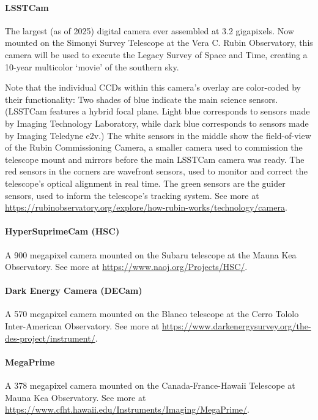 \paragraph{LSSTCam}

The largest (as of 2025) digital camera ever assembled at 3.2 gigapixels.
Now mounted on the Simonyi Survey Telescope at the Vera C. Rubin Observatory, this camera will be used to execute the Legacy Survey of Space and Time, creating a 10-year multicolor `movie' of the southern sky.

Note that the individual CCDs within this camera's overlay are color-coded by their functionality:
Two shades of blue indicate the main science sensors.
(LSSTCam features a hybrid focal plane.
Light blue corresponds to sensors made by Imaging Technology Laboratory, while dark blue corresponds to sensors made by Imaging Teledyne e2v.)
The white sensors in the middle show the field-of-view of the Rubin Commissioning Camera, a smaller camera used to commission the telescope mount and mirrors before the main LSSTCam camera was ready.
The red sensors in the corners are wavefront sensors, used to monitor and correct the telescope's optical alignment in real time.
The green sensors are the guider sensors, used to inform the telescope's tracking system.
See more at \url{https://rubinobservatory.org/explore/how-rubin-works/technology/camera}.

\paragraph{HyperSuprimeCam (HSC)}

A 900 megapixel camera mounted on the Subaru telescope at the Mauna Kea Observatory.
See more at \url{https://www.naoj.org/Projects/HSC/}.

\paragraph{Dark Energy Camera (DECam)}

A 570 megapixel camera mounted on the Blanco telescope at the Cerro Tololo Inter-American Observatory.
See more at \url{https://www.darkenergysurvey.org/the-des-project/instrument/}.

\paragraph{MegaPrime}

A 378 megapixel camera mounted on the Canada-France-Hawaii Telescope at Mauna Kea Observatory.
See more at \url{https://www.cfht.hawaii.edu/Instruments/Imaging/MegaPrime/}.

